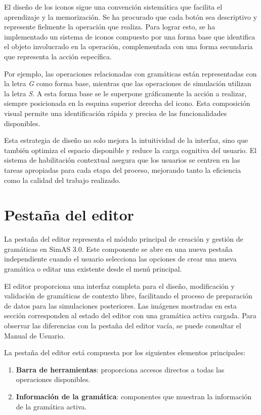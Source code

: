 El diseño de los iconos sigue una convención sistemática que facilita el aprendizaje y la memorización. Se ha procurado que cada botón sea descriptivo y represente fielmente la operación que realiza. Para lograr esto, se ha implementado un sistema de iconos compuesto por una forma base que identifica el objeto involucrado en la operación, complementada con una forma secundaria que representa la acción específica.

Por ejemplo, las operaciones relacionadas con gramáticas están representadas con la letra \textit{G} como forma base, mientras que las operaciones de simulación utilizan la letra \textit{S}. A esta forma base se le superpone gráficamente la acción a realizar, siempre posicionada en la esquina superior derecha del icono. Esta composición visual permite una identificación rápida y precisa de las funcionalidades disponibles.

Esta estrategia de diseño no solo mejora la intuitividad de la interfaz, sino que también optimiza el espacio disponible y reduce la carga cognitiva del usuario. El sistema de habilitación contextual asegura que los usuarios se centren en las tareas apropiadas para cada etapa del proceso, mejorando tanto la eficiencia como la calidad del trabajo realizado.
  

\section{Pestaña del editor}

La pestaña del editor representa el módulo principal de creación y gestión de gramáticas en SimAS 3.0. Este componente se abre en una nueva pestaña independiente cuando el usuario selecciona las opciones de crear una nueva gramática o editar una existente desde el menú principal.

El editor proporciona una interfaz completa para el diseño, modificación y validación de gramáticas de contexto libre, facilitando el proceso de preparación de datos para las simulaciones posteriores. Las imágenes mostradas en esta sección corresponden al estado del editor con una gramática activa cargada. Para observar las diferencias con la pestaña del editor vacía, se puede consultar el Manual de Usuario.

La pestaña del editor está compuesta por los siguientes elementos principales:
\begin{enumerate}
 \item \textbf{Barra de herramientas}: proporciona accesos directos a todas las operaciones disponibles.
 \item \textbf{Información de la gramática}: componentes que muestran la información de la gramática activa.
\end{enumerate}

